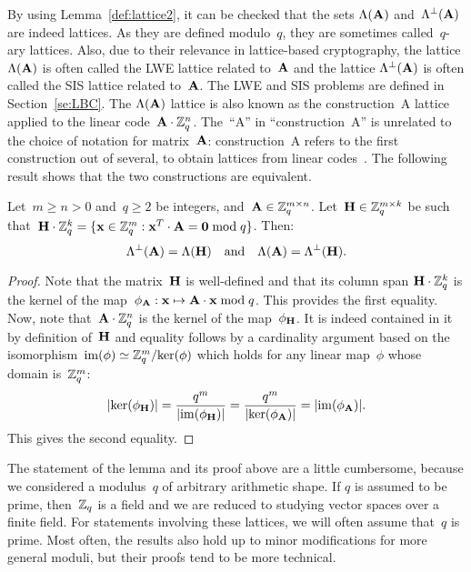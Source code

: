 By using Lemma~\ref{def:lattice2}, it can be checked that the sets $\Lambda({\bf A})$ and~$\Lambda^\perp({\bf A})$ are indeed lattices. As they are defined modulo~$q$, they are sometimes called~$q$-ary lattices. Also, due to their relevance in lattice-based cryptography, the lattice $\Lambda({\bf A})$ is often called the LWE lattice related to~${\bf A}$ and the lattice $\Lambda^\perp({\bf A})$ is often called the SIS lattice related to~${\bf A}$. The LWE and SIS problems are defined in Section~\ref{se:LBC}. The $\Lambda({\bf A})$ lattice is also known as the construction~A lattice 
applied to the linear code~${\bf A} \cdot \mathbb{Z}_q^n$. The~``A'' in ``construction~A'' is unrelated to the choice of notation for matrix~${\bf A}$: construction~A refers to the first construction out of several, to obtain lattices from linear codes~\cite[Chapter~7]{CS99}. 
The following result shows that the two constructions are equivalent. 


\begin{lemma}
\label{le:qary_eq}
Let~$m \geq n >0$ and~$q \geq 2$ be integers, and~${\bf A} \in \mathbb{Z}_q^{m \times n}$.
Let~${\bf H} \in \mathbb{Z}_q^{m \times k}$ be such that~${\bf H} \cdot \mathbb{Z}_q^k = \{ {\bf x} \in  \mathbb{Z}_q^m : {\bf x}^T \cdot {\bf A} = {\bf 0} \bmod q\}$. Then:
\[
\Lambda^\perp({\bf A}) = \Lambda({\bf H}) \ \ \mbox{ and } \ \ \Lambda({\bf A}) =  \Lambda^\perp({\bf H}).
\]
\end{lemma}

\begin{proof}
Note  that the matrix~${\bf H}$ is well-defined and that its column span ${\bf H} \cdot \mathbb{Z}_q^k$ is  the kernel of the 
map~$\phi_{\bf A}: {\bf x} \mapsto {\bf A}\cdot {\bf x} \bmod q$. This provides the first equality. Now, note that~${\bf A} \cdot \mathbb{Z}_q^n$
is  the kernel of the map~$\phi_{\bf H}$. It is indeed contained in it by definition of~${\bf H}$ and equality follows by a cardinality argument
based on the isomorphism~$\mathrm{im}(\phi) \simeq \mathbb{Z}_q^m / \mathrm{ker} (\phi)$ which holds for any linear map~$\phi$ whose domain is~$\mathbb{Z}_q^m$:
\[
|\mathrm{ker}(\phi_{\bf H})| = \frac{q^m}{|\mathrm{im}(\phi_{\bf H})|} = \frac{q^m}{|\mathrm{ker}(\phi_{\bf A})|} = |\mathrm{im}( \phi_{\bf A})|.
\]
This gives the second equality.
\end{proof}

The statement of the lemma and its proof above are a little cumbersome, because we considered a modulus~$q$ of arbitrary arithmetic shape. If $q$ is assumed to be prime, then~$\mathbb{Z}_q$ is a field and we are reduced to studying vector spaces over a finite field. For statements involving these lattices, we will often assume that~$q$ is prime. Most often, the results also hold up to minor modifications for more general moduli, but their proofs tend to be more technical.


